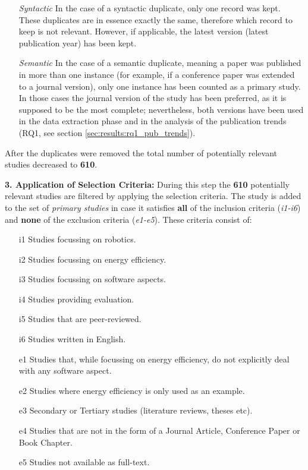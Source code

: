 \vspace{1mm}

\begin{enumerate}
    \item[\textit{Syntactic}] In the case of a syntactic duplicate, only one record was kept. 
    These duplicates are in essence exactly the same, therefore which record to keep is not relevant.
    However, if applicable, the latest version (latest publication year) has been kept.

    \item[\textit{Semantic}] In the case of a semantic duplicate, meaning a paper was published in more than one instance 
    (for example, if a conference paper was extended to a journal version), only one instance has been counted as a primary study. 
    In those cases the journal version of the study has been preferred, as it is supposed to be the most complete; nevertheless, 
    both versions have been used in the data extraction phase and in the analysis of the publication trends (RQ1, see section \ref{sec:results:rq1_pub_trends}).

\end{enumerate}
After the duplicates were removed the total number of potentially relevant studies decreased to \textbf{610}.

\vspace{2mm}

\noindent\textbf{3. Application of Selection Criteria:}
During this step the \textbf{610} potentially relevant studies are filtered by applying the selection criteria. 
The study is added to the set of \textit{primary studies} in case it satisfies \textbf{all} of the inclusion criteria (\textit{i1-i6}) 
and \textbf{none} of the exclusion criteria (\textit{e1-e5}). 
These criteria consist of:
\begin{itemize}
    \item[i1] Studies focussing on robotics.
	\item[i2] Studies focussing on energy efficiency.
    \item[i3] Studies focussing on software aspects.
    \item[i4] Studies providing evaluation.
    \item[i5] Studies that are peer-reviewed.
    \item[i6] Studies written in English.
    
	\item[e1] Studies that, while focussing on energy efficiency, do not explicitly deal with any software aspect.
    \item[e2] Studies where energy efficiency is only used as an example.
    \item[e3] Secondary or Tertiary studies (literature reviews, theses etc).
    \item[e4] Studies that are not in the form of a Journal Article, Conference Paper or Book Chapter.
    \item[e5] Studies not available as full-text.
\end{itemize}

